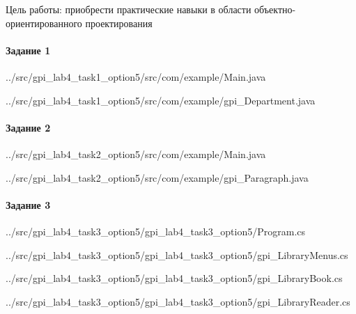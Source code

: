 Цель работы:
приобрести практические навыки в области объектно-ориентированного проектирования


\paragraph{Задание 1} \hspace{0pt}


{../src/gpi_lab4_task1_option5/src/com/example/Main.java}


{../src/gpi_lab4_task1_option5/src/com/example/gpi_Department.java}



\paragraph{Задание 2} \hspace{0pt}


{../src/gpi_lab4_task2_option5/src/com/example/Main.java}


{../src/gpi_lab4_task2_option5/src/com/example/gpi_Paragraph.java}



\paragraph{Задание 3} \hspace{0pt}


{../src/gpi_lab4_task3_option5/gpi_lab4_task3_option5/Program.cs}


{../src/gpi_lab4_task3_option5/gpi_lab4_task3_option5/gpi_LibraryMenus.cs}


{../src/gpi_lab4_task3_option5/gpi_lab4_task3_option5/gpi_LibraryBook.cs}


{../src/gpi_lab4_task3_option5/gpi_lab4_task3_option5/gpi_LibraryReader.cs}

\newpage

